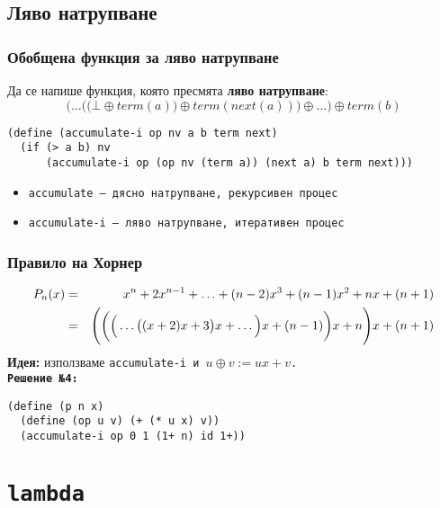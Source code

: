 \documentclass{beamer}
\begin{document}
\subsection{Ляво натрупване}

\begin{frame}[fragile]
  \frametitle{Обобщена функция за ляво натрупване}

  Да се напише функция, която пресмята \textbf{ляво натрупване}:
  \begin{equation*}
    \bigg(\ldots\Big(\big(\bot \oplus term(a)\big) \oplus term(next(a))\Big) \oplus \ldots\bigg) \oplus term(b)
  \end{equation*}
  \pause
  \small
\begin{lstlisting}
(define (accumulate-i op nv a b term next)
  (if (> a b) nv
      (accumulate-i op (op nv (term a)) (next a) b term next)))
\end{lstlisting}
  \pause
  \begin{itemize}
  \item \tt{accumulate} --- дясно натрупване, рекурсивен процес
  \item \tt{accumulate-i} --- ляво натрупване, итеративен процес
  \end{itemize}
\end{frame}

\begin{frame}[fragile]
  \frametitle{Правило на Хорнер}

  \begin{eqnarray*}
    P_n(x) &=& x^n + 2x^{n-1} + \ldots + (n-2)x^3 + (n-1)x^2 + nx + (n+1)\\
    &=& \Bigg(\bigg(\Big(\ldots\big((x + 2)x + 3\big)x + \ldots\Big)x + (n-1)\bigg)x + n\Bigg)x + (n+1)
  \end{eqnarray*}
  \textbf{Идея:} използваме \tt{accumulate-i} и $u \oplus v := ux + v$.\\[1em]
  \pause
  \textbf{Решение №4:}
\begin{lstlisting}
(define (p n x)
  (define (op u v) (+ (* u x) v))
  (accumulate-i op 0 1 (1+ n) id 1+))
\end{lstlisting}
\end{frame}

\section{\tt{lambda}}
\end{document}
